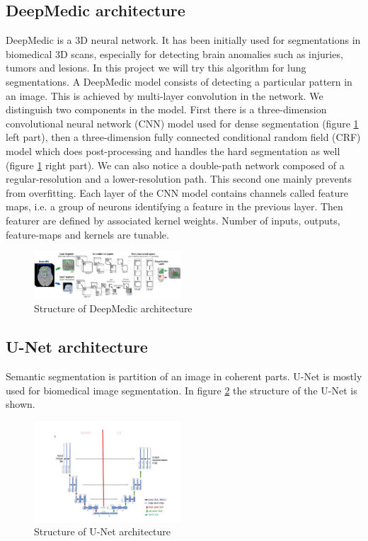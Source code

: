 \subsection{DeepMedic architecture}
DeepMedic is a 3D neural network. It has been initially used for segmentations in biomedical 3D scans, especially for detecting brain anomalies such as injuries, tumors and lesions. In this project we will try this algorithm for lung segmentations. \newline 
A DeepMedic model consists of detecting a particular pattern in an image. This is achieved by multi-layer convolution in the network. We distinguish two components in the model. First there is a three-dimension convolutional neural network (CNN) model used for dense segmentation (figure \ref{deepmedic} left part), then  a three-dimension fully connected conditional random field (CRF) model which does post-processing and handles the hard segmentation as well (figure \ref{deepmedic} right part). We can also notice a double-path network composed of a regular-resolution and a lower-resolution path. This second one mainly prevents from overfitting.
Each layer of the CNN model contains channels called feature maps, i.e. a group of neurons identifying a feature in the previous layer. Then featurer are defined by associated kernel weights. Number of inputs, outputs, feature-maps and kernels are tunable.

\begin{figure}[h!]
	\includegraphics[width=0.49\textwidth, angle=0]{files/deepmedic.png}
	\caption{Structure of DeepMedic architecture}
	\label{deepmedic}
\end{figure}

\subsection{U-Net architecture}
Semantic segmentation is partition of an image in coherent parts. U-Net is mostly used for biomedical image segmentation. In figure \ref{unetstructure} the structure of the U-Net is shown.\newline

\begin{figure}[h!]
	\includegraphics[width=0.49\textwidth, angle=0]{files/unetstructure.jpg}
	\caption{Structure of U-Net architecture}
	\label{unetstructure}
\end{figure}

